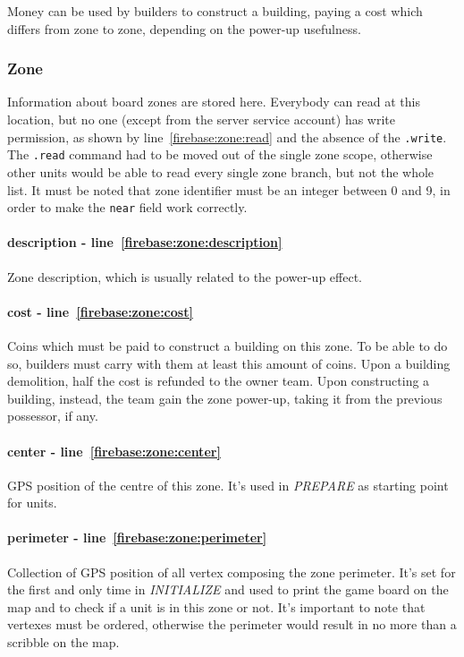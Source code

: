				Money can be used by builders to construct a building, paying a cost which differs from zone to zone, depending on the power-up usefulness.
			
			\subsubsection{Zone}
			
			
							
			Information about board zones are stored here.
			Everybody can read at this location, but no one (except from the server service account) has write permission, as shown by line~\ref{firebase:zone:read} and the absence of the \lstinline|.write|.
			The \lstinline|.read| command had to be moved out of the single zone scope, otherwise other units would be able to read every single zone branch, but not the whole list.
			It must be noted that zone identifier must be an integer between 0 and 9, in order to make the \lstinline|near| field work correctly.
			
			\paragraph{description - line~\ref{firebase:zone:description}}
			Zone description, which is usually related to the power-up effect.
			
			\paragraph{cost - line~\ref{firebase:zone:cost}}
			Coins which must be paid to construct a building on this zone. To be able to do so, builders must carry with them at least this amount of coins. Upon a building demolition, half the cost is refunded to the owner team. Upon constructing a building, instead, the team gain the zone power-up, taking it from the previous possessor, if any.
			
			\paragraph{center - line~\ref{firebase:zone:center}}
			GPS position of the centre of this zone. It's used in \emph{PREPARE} as starting point for units.
			
			\paragraph{perimeter - line~\ref{firebase:zone:perimeter}}
			Collection of GPS position of all vertex composing the zone perimeter. It's set for the first and only time in \emph{INITIALIZE} and used to print the game board on the map and to check if a unit is in this zone or not. It's important to note that vertexes must be ordered, otherwise the perimeter would result in no more than a scribble on the map.
			
